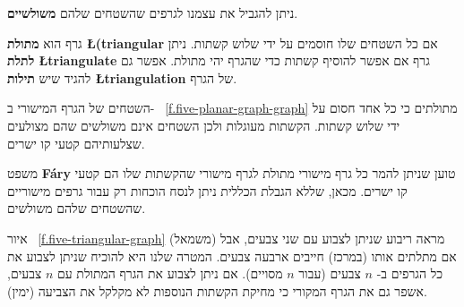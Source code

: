 %
%
ניתן להגביל את עצמנו לגרפים שהשטחים שלהם
\textbf{משולשיים}.

\begin{definition}
גרף הוא
\textbf{מתולת
\L{(triangular}}
אם כל השטחים שלו חוסמים על ידי שלוש קשתות. ניתן 
\textbf{לתלת
\L{triangulate}}
גרף אם אפשר להוסיף קשתות כדי שהגרף יהי מתולת. אפשר גם להגיד שיש
\textbf{תילות
\L{triangulation}}
של הגרף.
\end{definition}

\begin{example}
השטחים של הגרף המישורי ב-%
~\ref{f.five-planar-graph-graph}
מתולתים כי כל אחד חסום על ידי שלוש קשתות. הקשתות מעוגלות ולכן השטחים אינם משולשים שהם מצולעים שצלעותיהם קטעי קו ישרים.
\end{example}

\begin{advanced}
משפט
\textbf{F\'{a}ry}
טוען שניתן להמר כל גרף מישורי מתולת לגרף מישורי שהקשתות שלו הם קטעי קו ישרים. מכאן, שללא הגבלת הכללית ניתן לנסח הוכחות רק עבור גרפים מישוריים שהשטחים שלהם משולשים.
\end{advanced}

\begin{example}
איור%
~\ref{f.five-triangular-graph}
(משמאל) מראה ריבוע שניתן לצבוע עם שני צבעים, אבל אם מתלתים אותו (במרכז) חייבים ארבעה צבעים. המטרה שלנו היא להוכיח שניתן לצבוע את כל הגרפים ב-%
$n$
צבעים (עבור
$n$
מסויים). אם ניתן לצבוע את הגרף המתולת עם 
$n$
צבעים, אשפר גם את הגרף המקורי כי מחיקת הקשתות הנוספות לא מקלקל את הצביעה (ימין).
\end{example}


